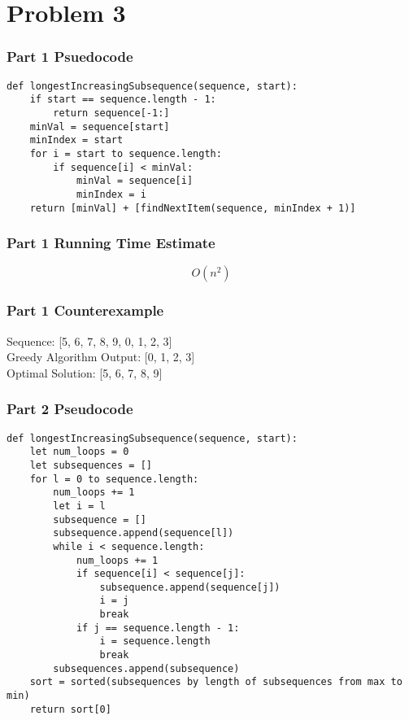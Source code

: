 \documentclass{math}
\begin{document}
\section*{Problem 3}

\subsubsection*{Part 1 Psuedocode}
\begin{lstlisting}
def longestIncreasingSubsequence(sequence, start):
    if start == sequence.length - 1:
        return sequence[-1:]
    minVal = sequence[start]
    minIndex = start
    for i = start to sequence.length:
        if sequence[i] < minVal:
            minVal = sequence[i]
            minIndex = i
    return [minVal] + [findNextItem(sequence, minIndex + 1)]
\end{lstlisting}

\subsubsection*{Part 1 Running Time Estimate}
\[ O(n^2) \]

\subsubsection*{Part 1 Counterexample}
Sequence: [5, 6, 7, 8, 9, 0, 1, 2, 3] \\
Greedy Algorithm Output: [0, 1, 2, 3] \\
Optimal Solution: [5, 6, 7, 8, 9]

\subsubsection*{Part 2 Pseudocode}
\begin{lstlisting}
def longestIncreasingSubsequence(sequence, start):
    let num_loops = 0
    let subsequences = []
    for l = 0 to sequence.length:
        num_loops += 1
        let i = l
        subsequence = []
        subsequence.append(sequence[l])
        while i < sequence.length:
            num_loops += 1
            if sequence[i] < sequence[j]:
                subsequence.append(sequence[j])
                i = j
                break
            if j == sequence.length - 1:
                i = sequence.length
                break
        subsequences.append(subsequence)
    sort = sorted(subsequences by length of subsequences from max to min)
    return sort[0]
\end{lstlisting}
\end{document}
